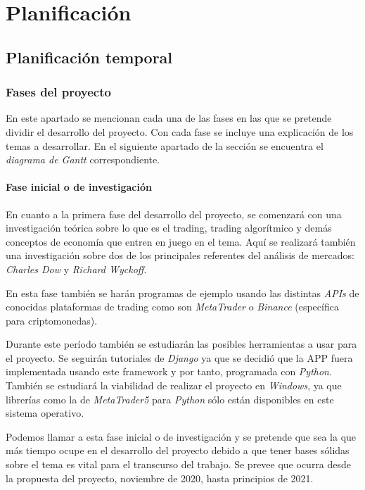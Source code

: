 

\chapter{Planificación}

\section{Planificación temporal}

\subsection{Fases del proyecto}

En este apartado se mencionan cada una de las fases en las que se pretende dividir el desarrollo del proyecto. Con cada fase se incluye una explicación de los temas a desarrollar. En el siguiente apartado de la sección se encuentra el \textit{diagrama de Gantt} correspondiente.

\subsubsection{Fase inicial o de investigación}

En cuanto a la primera fase del desarrollo del proyecto, se comenzará con una investigación teórica sobre lo que es el trading, trading algorítmico y demás conceptos de economía que entren en juego en el tema. Aquí se realizará también una investigación sobre dos de los principales referentes del análisis de mercados: \textit{Charles Dow} y \textit{Richard Wyckoff}. \newline

En esta fase también se harán programas de ejemplo usando las distintas \textit{APIs} de conocidas plataformas de trading como son \textit{MetaTrader} o \textit{Binance} (específica para criptomonedas). \newline

Durante este período también se estudiarán las posibles herramientas a usar para el proyecto. Se seguirán tutoriales de \textit{Django} ya que se decidió que la APP fuera implementada usando este framework y por tanto, programada con \textit{Python}. También se estudiará la viabilidad de realizar el proyecto en \textit{Windows}, ya que librerías como la de \textit{MetaTrader5} para \textit{Python} sólo están disponibles en este sistema operativo. \newline


Podemos llamar a esta fase inicial o de investigación y se pretende que sea la que más tiempo ocupe en el desarrollo del proyecto debido a que tener bases sólidas sobre el tema es vital para el transcurso del trabajo. Se prevee que ocurra desde la propuesta del proyecto, noviembre de 2020, hasta principios de 2021. \newline


